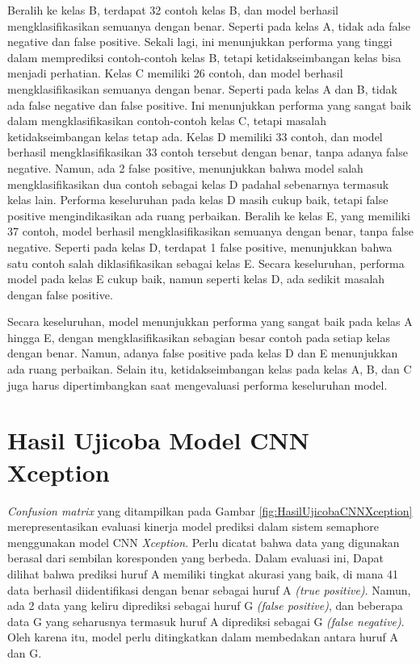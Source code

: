 Beralih ke kelas B, terdapat 32 contoh kelas B, dan model berhasil mengklasifikasikan semuanya dengan benar. Seperti pada kelas A, tidak ada false negative dan false positive. Sekali lagi, ini menunjukkan performa yang tinggi dalam memprediksi contoh-contoh kelas B, tetapi ketidakseimbangan kelas bisa menjadi perhatian. Kelas C memiliki 26 contoh, dan model berhasil mengklasifikasikan semuanya dengan benar. Seperti pada kelas A dan B, tidak ada false negative dan false positive. Ini menunjukkan performa yang sangat baik dalam mengklasifikasikan contoh-contoh kelas C, tetapi masalah ketidakseimbangan kelas tetap ada. Kelas D memiliki 33 contoh, dan model berhasil mengklasifikasikan 33 contoh tersebut dengan benar, tanpa adanya false negative. Namun, ada 2 false positive, menunjukkan bahwa model salah mengklasifikasikan dua contoh sebagai kelas D padahal sebenarnya termasuk kelas lain. Performa keseluruhan pada kelas D masih cukup baik, tetapi false positive mengindikasikan ada ruang perbaikan. Beralih ke kelas E, yang memiliki 37 contoh, model berhasil mengklasifikasikan semuanya dengan benar, tanpa false negative. Seperti pada kelas D, terdapat 1 false positive, menunjukkan bahwa satu contoh salah diklasifikasikan sebagai kelas E. Secara keseluruhan, performa model pada kelas E cukup baik, namun seperti kelas D, ada sedikit masalah dengan false positive.

Secara keseluruhan, model menunjukkan performa yang sangat baik pada kelas A hingga E, dengan mengklasifikasikan sebagian besar contoh pada setiap kelas dengan benar. Namun, adanya false positive pada kelas D dan E menunjukkan ada ruang perbaikan. Selain itu, ketidakseimbangan kelas pada kelas A, B, dan C juga harus dipertimbangkan saat mengevaluasi performa keseluruhan model.

\section{Hasil Ujicoba Model CNN Xception}
\textit{Confusion matrix} yang ditampilkan pada Gambar  \ref{fig:HasilUjicobaCNNXception} merepresentasikan evaluasi kinerja model prediksi dalam sistem semaphore menggunakan model CNN \textit{Xception}. Perlu dicatat bahwa data yang digunakan berasal dari sembilan koresponden yang berbeda. Dalam evaluasi ini, Dapat dilihat bahwa prediksi huruf A memiliki tingkat akurasi yang baik, di mana 41 data berhasil diidentifikasi dengan benar sebagai huruf A \textit{(true positive)}. Namun, ada 2 data yang keliru diprediksi sebagai huruf G \textit{(false positive)}, dan beberapa data G yang seharusnya termasuk huruf A diprediksi sebagai G \textit{(false negative)}. Oleh karena itu, model perlu ditingkatkan dalam membedakan antara huruf A dan G.

